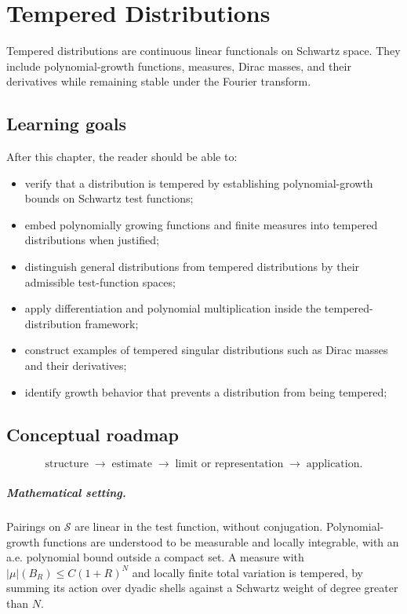 \chapter{Tempered Distributions}
\label{ch:iii18}

Tempered distributions are continuous linear functionals on Schwartz space. They include polynomial-growth functions, measures, Dirac masses, and their derivatives while remaining stable under the Fourier transform.

\section*{Learning goals}
After this chapter, the reader should be able to:
\begin{itemize}
\item verify that a distribution is tempered by establishing polynomial-growth bounds on Schwartz test functions;
\item embed polynomially growing functions and finite measures into tempered distributions when justified;
\item distinguish general distributions from tempered distributions by their admissible test-function spaces;
\item apply differentiation and polynomial multiplication inside the tempered-distribution framework;
\item construct examples of tempered singular distributions such as Dirac masses and their derivatives;
\item identify growth behavior that prevents a distribution from being tempered;
\end{itemize}
\section*{Conceptual roadmap}
\[
\boxed{\text{structure}\;\longrightarrow\;\text{estimate}\;\longrightarrow\;\text{limit or representation}\;\longrightarrow\;\text{application}.}
\]

\paragraph{Mathematical setting.}
Pairings on $\mathcal S$ are linear in the test function, without conjugation. Polynomial-growth functions are understood to be measurable and locally integrable, with an a.e. polynomial bound outside a compact set. A measure with $|\mu|(B_R)\le C(1+R)^N$ and locally finite total variation is tempered, by summing its action over dyadic shells against a Schwartz weight of degree greater than $N$.

